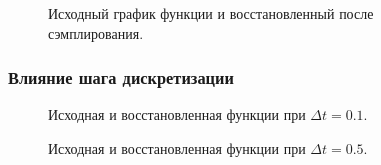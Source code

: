 \documentclass[a5paper, 10pt]{article}
\theoremstyle{definition}
\theoremstyle{plain}
\theoremstyle{remark}
\begin{document}
\begin{figure}[h!]
\caption{Исходный график функции и восстановленный после сэмплирования.}
\end{figure}


\newpage
\subsubsection{Влияние шага дискретизации}
\begin{figure}[h!]
\caption{Исходная и восстановленная функции при $\Delta t = 0.1$.}
\caption{Исходная и восстановленная функции при $\Delta t = 0.5$.}
\end{figure}
\end{document}
